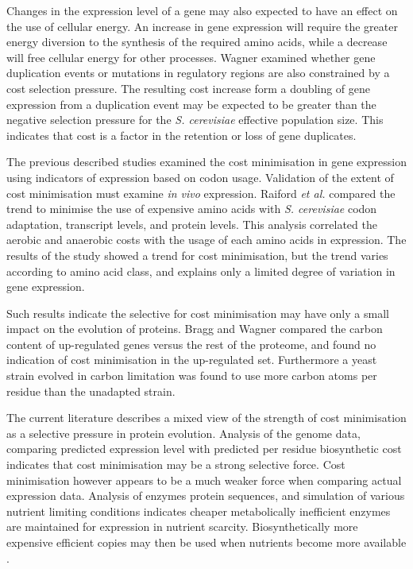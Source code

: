 Changes in the expression level of a gene may also expected to have an effect on the use of cellular energy. An increase in gene expression will require the greater energy diversion to the synthesis of the required amino acids, while a decrease will free cellular energy for other processes. Wagner \cite{wagner2005} examined whether gene duplication events or mutations in regulatory regions are also constrained by a cost selection pressure. The resulting cost increase form a doubling of gene expression from a duplication event may be expected to be greater than the negative selection pressure for the \emph{S. cerevisiae} effective population size. This indicates that cost is a factor in the retention or loss of gene duplicates.

The previous described studies examined the cost minimisation in gene expression using indicators of expression based on codon usage. Validation of the extent of cost minimisation must examine \emph{in vivo} expression. Raiford \emph{et al.} \cite{raiford2008} compared the trend to minimise the use of expensive amino acids with \emph{S. cerevisiae} codon adaptation, transcript levels, and protein levels. This analysis correlated the aerobic and anaerobic costs with the usage of each amino acids in expression. The results of the study showed a trend for cost minimisation, but the trend varies according to amino acid class, and explains only a limited degree of variation in gene expression.

Such results indicate the selective for cost minimisation may have only a small impact on the evolution of proteins. Bragg and Wagner \cite{bragg2007} compared the carbon content of up-regulated genes versus the rest of the proteome, and found no indication of cost minimisation in the up-regulated set. Furthermore a yeast strain evolved in carbon limitation was found to use more carbon atoms per residue than the unadapted strain.

The current literature describes a mixed view of the strength of cost minimisation as a selective pressure in protein evolution. Analysis of the genome data, comparing predicted expression level with predicted per residue biosynthetic cost indicates that cost minimisation may be a strong selective force. Cost minimisation however appears to be a much weaker force when comparing actual expression data. Analysis of enzymes protein sequences, and simulation of various nutrient limiting conditions indicates cheaper metabolically inefficient enzymes are maintained for expression in nutrient scarcity. Biosynthetically more expensive efficient copies may then be used when nutrients become more available \cite{carlson2007}.

